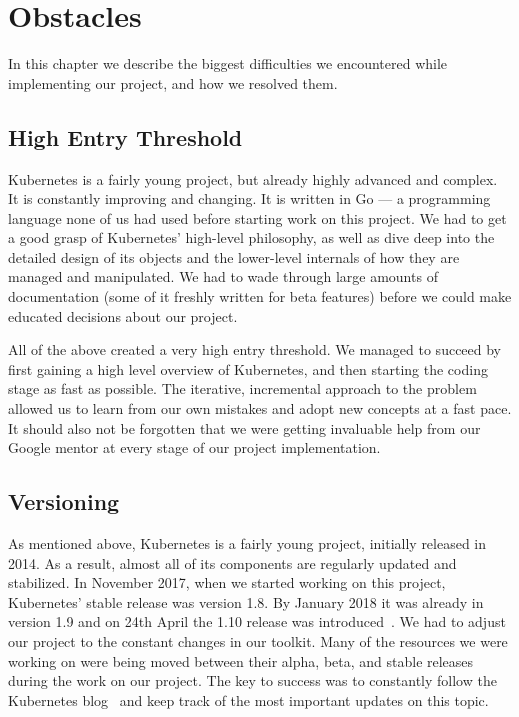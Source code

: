\chapter{Obstacles}
In this chapter we describe the biggest difficulties we encountered while implementing our project,
and how we resolved them.

\section{High Entry Threshold}
Kubernetes is a fairly young project, but already highly advanced and complex. It is constantly
improving and changing. It is written in Go --- a programming language none of
us had used before starting work on this project. We had to get a good grasp of Kubernetes’
high-level philosophy, as well as dive deep into the detailed design of its objects and the
lower-level internals of how they are managed and manipulated. We had to wade through large amounts
of documentation (some of it freshly written for beta features) before we could make educated
decisions about our project.

All of the above created a very high entry threshold. We managed to succeed by
first gaining a high level overview of Kubernetes, and then starting the coding stage as fast as
possible. The iterative, incremental approach to the problem allowed us to learn from our own mistakes
and adopt new concepts at a fast pace. It should also not be forgotten that we were getting
invaluable help from our Google mentor at every stage of our project implementation.

\section{Versioning}
As mentioned above, Kubernetes is a fairly young project, initially released in 2014. As a result,
almost all of its components are regularly updated and stabilized. In November 2017, when we
started working on this project, Kubernetes' stable release was version 1.8. By January 2018 it was
already in version 1.9 and on 24th April the 1.10 release was introduced~\cite{releases}. We had to adjust our
project to the constant changes in our toolkit. Many of the resources we were working on were
being moved between their alpha, beta, and stable releases during the work on our project. The key to
success was to constantly follow the Kubernetes blog~\cite{blog} and keep track of the most important updates
on this topic.

